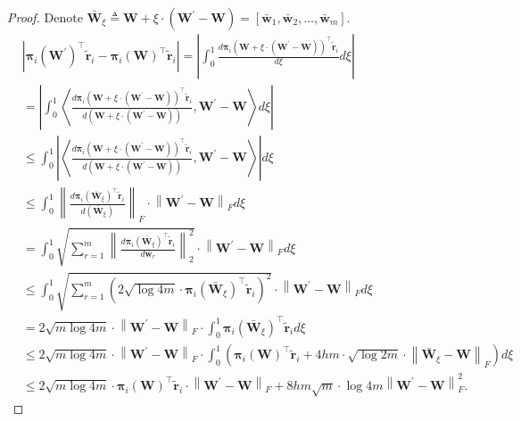 \documentclass[10pt]{article}
\def\rvw{{\mathbf{w}}}
\def\rvtilder{{\tilde{\mathbf{r}}}}
\def\rvpi{{\boldsymbol{\pi}}}
\def\rmW{{\mathbf{W}}}
\begin{document}
\begin{proof}
Denote $\bar{\rmW}_\xi \triangleq \rmW +  \xi \cdot\left( \rmW^\prime - \rmW \right) = \left[ \bar{\rvw}_1, \bar{\rvw}_2, \dots, \bar{\rvw}_m \right]$.
\begin{equation*}
\begin{split}
    &\left| \rvpi_i\left( \rmW^\prime \right)^\top \rvtilder_i - \rvpi_i\left( \rmW \right)^\top \rvtilder_i \right| = \left| \int_{0}^{1} { \frac{ d \rvpi_i\left( \rmW +  \xi \cdot\left( \rmW^\prime - \rmW \right) \right)^\top \rvtilder_i }{d\xi} } d\xi \right| \\
    &= \left| \int_{0}^{1}{ \left\langle \frac{d \rvpi_i\left( \rmW +  \xi \cdot\left( \rmW^\prime - \rmW \right) \right)^\top \rvtilder_i }{d\left( \rmW +  \xi \cdot\left( \rmW^\prime - \rmW \right) \right)}, \rmW^\prime - \rmW \right\rangle d\xi} \right| \\
    &\le \int_{0}^{1}{ \left| \left\langle \frac{d \rvpi_i\left( \rmW +  \xi \cdot\left( \rmW^\prime - \rmW \right) \right)^\top \rvtilder_i }{d\left( \rmW +  \xi \cdot\left( \rmW^\prime - \rmW \right) \right)}, \rmW^\prime - \rmW \right\rangle \right| d\xi} \\
    &\le \int_{0}^{1}{  \left\| \frac{d \rvpi_i\left( \bar{\rmW}_\xi \right)^\top \rvtilder_i }{d\left( \bar{\rmW}_\xi \right)} \right\|_F \cdot \left\| \rmW^\prime - \rmW \right\|_F d\xi} \\
    &= \int_{0}^{1}{  \sqrt{ \sum\limits_{r=1}^{m}{\left\| \frac{d \rvpi_i\left( \bar{\rmW}_\xi \right)^\top \rvtilder_i }{d \bar{\rvw}_r}\right\|_2^2 } } \cdot \left\| \rmW^\prime - \rmW \right\|_F d\xi} \\
    &\le \int_{0}^{1}{  \sqrt{ \sum\limits_{r=1}^{m}{\left( 2 \sqrt{\log{4m}} \cdot \rvpi_i\left( \bar{\rmW}_\xi \right)^\top \rvtilder_i \right)^2 } } \cdot \left\| \rmW^\prime - \rmW \right\|_F d\xi} \\
    &= 2 \sqrt{m \log{4m}} \cdot \left\| \rmW^\prime - \rmW \right\|_F  \cdot \int_{0}^{1}{ \rvpi_i\left( \bar{\rmW}_\xi \right)^\top \rvtilder_i d\xi} \\
    &\le 2 \sqrt{m \log{4m}} \cdot \left\| \rmW^\prime - \rmW \right\|_F  \cdot \int_{0}^{1}{ \left( \rvpi_i\left( \rmW \right)^\top \rvtilder_i + 4 h m \cdot \sqrt{\log{2m}} \cdot \left\| \bar{\rmW}_\xi - \rmW \right\|_F \right) d\xi} \\
    &\le 2 \sqrt{m \log{4m}} \cdot \rvpi_i\left( \rmW \right)^\top \rvtilder_i \cdot \left\| \rmW^\prime - \rmW \right\|_F + 8 h m \sqrt{m } \cdot \log{4m} \left\| \rmW^\prime - \rmW \right\|_F^2.

\end{split}
\end{equation*}
\end{proof}
\end{document}
